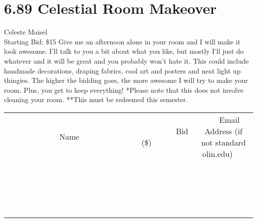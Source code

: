 \documentclass[11pt]{article}
\begin{document}
\section*{6.89 Celestial Room Makeover}
Celeste Maisel
\\
Starting Bid: \$15
\newline
Give me an afternoon alone in your room and I will make it look awesome.  I'll talk to you a bit about what you like, but mostly I'll just do whatever and it will be great and you probably won't hate it.  This could include handmade decorations, draping fabrics,  cool art and posters and neat light up thingies.  The higher the bidding goes, the more awesome I will try to make your room.  Plus, you get to keep everything!
*Please note that this does not involve cleaning your room.
**This must be redeemed this semester.
\\[3ex]
\begin{tabular}{c c c}
~~~~~~~~~~~~~Name~~~~~~~~~~~~~ & ~~~~~~~~~Bid (\$)~~~~~~~~~  & ~~~Email Address (if not standard olin.edu)~~~\\
 & & \\
\hline
 & & \\
\hline
 & & \\
\hline
 & & \\
\hline
 & & \\
\hline
 & & \\
\hline
 & & \\
\hline
 & & \\
\hline
 & & \\
\hline
 & & \\
\hline
 & & \\
\hline
 & & \\
\hline
 & & \\
\hline
 & & \\
\hline
 & & \\
\hline
 & & \\
\hline
 & & \\
\hline
 & & \\
\hline
 & & \\
\hline
\end{tabular}
\newpage
\end{document}
